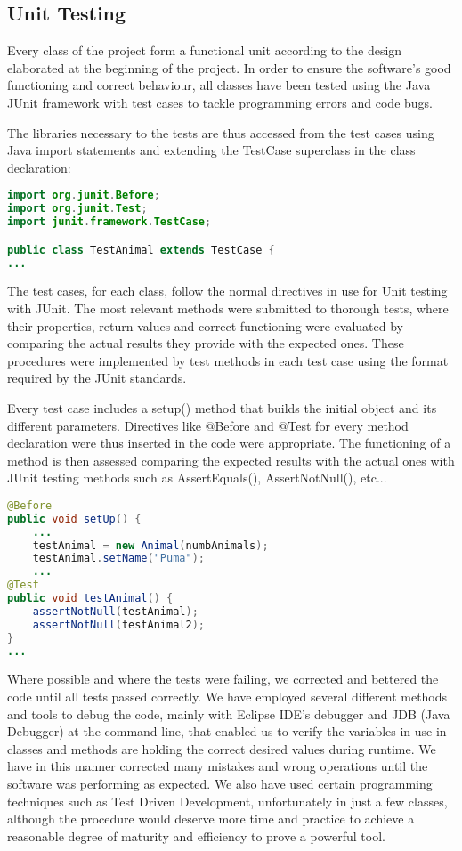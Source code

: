 \documentclass[11pt]{report}
\begin{document}
      \subsection{Unit Testing} %
      Every class of the project form a functional unit according to the design elaborated at the beginning of the project. In order to ensure the software's good functioning and correct behaviour, all classes have been tested using the Java JUnit framework with test cases to tackle programming errors and code bugs.

The libraries necessary to the tests are thus accessed from the test cases using Java import statements and extending the TestCase superclass in the class declaration:
\begin{lstlisting}[language=Java,caption= Test case headers, numbers=none]
import org.junit.Before;
import org.junit.Test;
import junit.framework.TestCase;

public class TestAnimal extends TestCase {
...
\end{lstlisting}

The test cases, for each class, follow the normal directives in use for Unit testing with JUnit. The most relevant methods were submitted to thorough tests, where their properties, return values and correct functioning were evaluated by comparing the actual results they provide with the expected ones. These procedures were implemented by test methods in each test case using the format required by the JUnit standards. 

Every test case includes a setup() method that builds the initial object and its different parameters. Directives like @Before and @Test for every method declaration were thus inserted in the code were appropriate. The functioning of a method is then assessed comparing the expected results with the actual ones with JUnit testing methods such as AssertEquals(), AssertNotNull(), etc...

\begin{lstlisting}[language=Java,caption= Use of JUnit directives in test cases, numbers=none]
@Before
public void setUp() {
    ...
    testAnimal = new Animal(numbAnimals);
    testAnimal.setName("Puma");
    ...
@Test
public void testAnimal() {
    assertNotNull(testAnimal);
    assertNotNull(testAnimal2);
} 
...
\end{lstlisting}

Where possible and where the tests were failing, we corrected and bettered the code until all tests passed correctly. We have employed several different methods and tools to debug the code, mainly with Eclipse IDE's debugger and JDB (Java Debugger) at the command line, that enabled us to verify the variables in use in classes and methods are holding the correct desired values during runtime. We have in this manner corrected many mistakes and wrong operations until the software was performing as expected. We also have used certain programming techniques such as Test Driven Development, unfortunately in just a few classes, although the procedure would deserve more time and practice to achieve a reasonable degree of maturity and efficiency to prove a powerful tool. 
\end{document}
